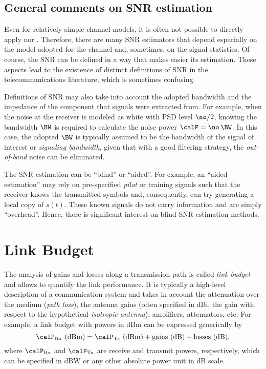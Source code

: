 \subsection{General comments on SNR estimation}
Even for relatively simple channel models, it is often not possible to directly apply  nor . Therefore, there are many SNR estimators that depend especially on the model adopted for the channel and, sometimes, on the signal statistics. 
Of course, the SNR can be defined in a way that makes easier its estimation. These aspects lead to the existence of distinct definitions of SNR in the telecommunications literature, which is sometimes confusing.

Definitions of SNR may also take into account the adopted bandwidth and the impedance of the component that signals were extracted from. For example, when the noise at the receiver is modeled as white with PSD level $\no/2$, knowing the bandwidth $\BW$ is required to calculate the noise power $\calP=\no \, \BW$. In this case, the adopted $\BW$ is typically assumed to be the bandwidth of the signal of interest or \emph{signaling bandwidth}, given that with a good filtering strategy, the \emph{out-of-band} noise can be eliminated.

The SNR estimation can be ``blind'' or ``aided''. For example, an ``aided-estimation'' may rely on pre-specified \emph{pilot} or training signals such that the receiver knows the transmitted symbols and, consequently, can try generating a local copy of $s(t)$.
These known signals do not carry information and are simply ``overhead''. Hence, there is significant interest on blind SNR estimation methods. %


\section{Link Budget}

The analysis of gains and losses along a transmission path is called \emph{link budget} and allows to quantify the link performance. It is typically a high-level description of a communication system and takes in account the attenuation over the medium (\emph{path loss}), the antenna gains (often specified in dBi, the gain with respect to the hypothetical \emph{isotropic antenna}), amplifiers, attenuators, etc. For example, a link budget with powers in dBm can be expressed generically by
\begin{equation}
\calP_{\textrm{Rx}} \textrm{~(dBm)} = \calP_{\textrm{Tx}} \textrm{~(dBm)} + \textrm{gains~(dB)} - \textrm{losses~(dB)},
\label{eq:linkBudgetIndBm}
\end{equation}
where $\calP_{\textrm{Rx}}$ and $\calP_{\textrm{Tx}}$ are receive and transmit powers, respectively, which can be specified in dBW or any other absolute power unit in dB scale.

